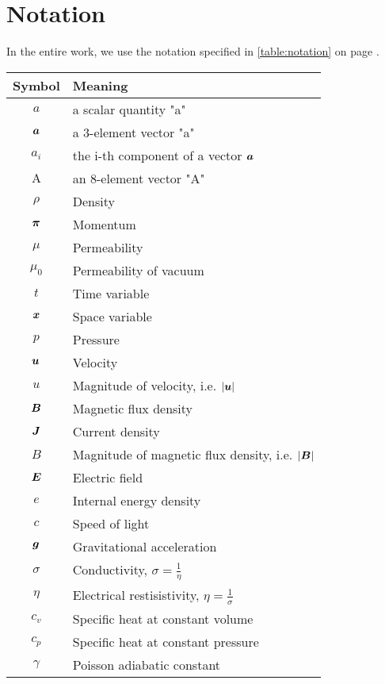 \section{Notation}
In the entire work, we use the notation specified in \ref{table:notation} on page \pageref{table:notation}.

\begin{table}
    \centering
    \begin{tabular}{ |c|l| } 
        \hline
        Symbol & Meaning \\ 
        \hline
        $a$ & a scalar quantity "a"\\
        $\mbox{\boldmath $a$}$ & a 3-element vector "a"\\
        $a_i$ & the i-th component of a vector $\mbox{\boldmath $a$}$ \\
        $\mathrm{A}$ & an 8-element vector "A" \\
        \hline
        $\rho$ & Density \\ 
        $\mbox{\boldmath $\pi$}$ & Momentum \\ 
        $\mu$ & Permeability \\ 
        $\mu_0$ & Permeability of vacuum\\ 
        $t$ & Time variable\\ 
        $\mbox{\boldmath $x$}$ & Space variable \\ 
        $p$ & Pressure \\ 
        $\mbox{\boldmath $u$}$ & Velocity \\ 
        $u$ & Magnitude of velocity, i.e. $|\mbox{\boldmath $u$}|$ \\ 
        $\mbox{\boldmath $B$}$ & Magnetic flux density \\ 
        $\mbox{\boldmath $J$}$ & Current density\\ 
        $B$ & Magnitude of magnetic flux density, i.e. $|\mbox{\boldmath $B$}|$ \\ 
        $\mbox{\boldmath $E$}$ & Electric field\\ 
        $e$ & Internal energy density \\ 
        $c$ & Speed of light\\ 
        $\mbox{\boldmath $g$}$ & Gravitational acceleration\\ 
        $\sigma$ & Conductivity, $\sigma = \frac{1}{\eta}$\\ 
        $\eta$ & Electrical restisistivity, $\eta = \frac{1}{\sigma}$\\
        $c_v$ & Specific heat at constant volume\\
        $c_p$ & Specific heat at constant pressure\\
        $\gamma$ & Poisson adiabatic constant\\

\end{tabular}
\end{table}
